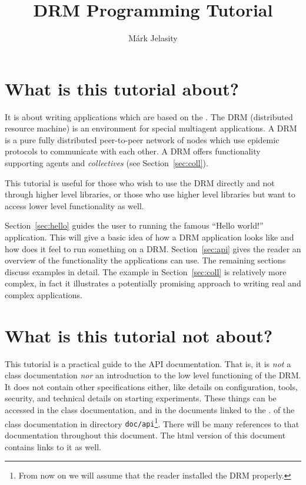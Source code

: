 \documentclass{article}
\title{DRM Programming Tutorial}
\author{M\'ark Jelasity}
\date{}
\begin{document}
\maketitle

\begin{htmlonly}
\tableofcontents
\end{htmlonly}

\section{What is this tutorial about?}

It is about writing applications which are based on the 
.
The DRM (distributed resource machine) is an environment for special
multiagent applications.
A DRM is a pure fully distributed peer-to-peer network of nodes
which use epidemic protocols to communicate with each other.
A DRM offers functionality supporting agents and {\em collectives} (see
Section~\ref{sec:coll}).

This tutorial is useful for those who wish to use the DRM directly
and not through higher level libraries, or those who use higher level
libraries but want to access lower level functionality as well.

Section~\ref{sec:hello} guides the user to running the famous ``Hello world!''
application.
This will give a basic idea of how a DRM application looks like and how does it
feel to run something on a DRM.
Section~\ref{sec:api} gives the reader an overview of the functionality
the applications can use.
The remaining sections discuss examples in detail.
The example in Section~\ref{sec:coll} is relatively more complex,
in fact it illustrates a potentially promising approach to writing
real and complex applications.

\section{What is this tutorial not about?}

This tutorial is a practical guide to the API documentation.
That is, it is {\em not} a class documentation {\em nor} an introduction
to the low level functioning of the DRM.
It does not contain other specifications either, like details on
configuration, tools, security, and technical details on starting experiments.
These things can be accessed in the class documentation, and
in the documents linked to the
.
of the class documentation
in directory {\tt doc/api}\footnote{%
From now on we will assume that the reader installed the DRM properly.}.
There will be many references to that documentation throughout this document.
The html version of this document contains links to it as well.
\end{document}
